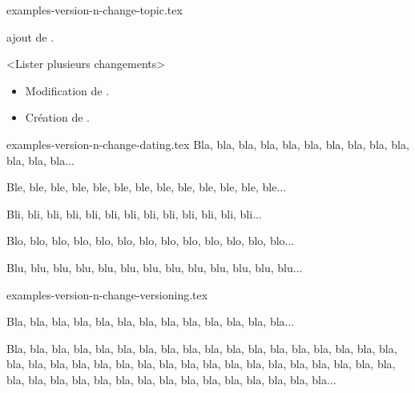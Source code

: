 \begin{filecontents*}{examples-version-n-change-topic.tex}
\begin{bdoctopic}
    ajout de .
\end{bdoctopic}

\begin{bdoctopic}<Lister plusieurs changements>
    \begin{itemize}
        \item Modification de .
        \item Création de .
    \end{itemize}
\end{bdoctopic}

\end{filecontents*}


\begin{filecontents*}{examples-version-n-change-dating.tex}
Bla, bla, bla, bla, bla, bla, bla, bla, bla, bla, bla, bla, bla...

\medskip


Ble, ble, ble, ble, ble, ble, ble, ble, ble, ble, ble, ble, ble...

\medskip


Bli, bli, bli, bli, bli, bli, bli, bli, bli, bli, bli, bli, bli...

Blo, blo, blo, blo, blo, blo, blo, blo, blo, blo, blo, blo, blo...

Blu, blu, blu, blu, blu, blu, blu, blu, blu, blu, blu, blu, blu...

\end{filecontents*}


\begin{filecontents*}{examples-version-n-change-versioning.tex}

Bla, bla, bla, bla, bla, bla, bla, bla, bla, bla, bla, bla, bla...

\bigskip %


Bla, bla, bla, bla, bla, bla, bla, bla, bla, bla, bla, bla, bla,
bla, bla, bla, bla, bla, bla, bla, bla, bla, bla, bla, bla, bla,
bla, bla, bla, bla, bla, bla, bla, bla, bla, bla, bla, bla, bla,
bla, bla, bla, bla, bla, bla, bla, bla, bla, bla, bla, bla...

\end{filecontents*}


